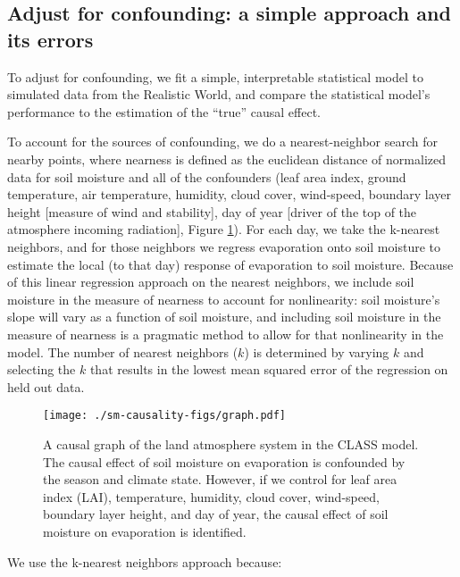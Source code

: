 \subsection{Adjust for confounding: a simple approach and its errors}
\label{sec:attempt-meth-adjust}

To adjust for confounding, we fit a simple, interpretable statistical
model to simulated data from the Realistic World, and compare the
statistical model's performance to the estimation of the ``true''
causal effect.

To account for the sources of confounding, we do a nearest-neighbor
search for nearby points, where nearness is defined as the euclidean
distance of normalized data for soil moisture and all of the
confounders (leaf area index, ground temperature, air temperature,
humidity, cloud cover, wind-speed, boundary layer height [measure of
  wind and stability], day of year [driver of the top of the
  atmosphere incoming radiation], Figure \ref{fig:graph}).  For each
day, we take the k-nearest neighbors, and for those neighbors we
regress evaporation onto soil moisture to estimate the local (to that
day) response of evaporation to soil moisture. Because of this linear
regression approach on the nearest neighbors, we include soil moisture
in the measure of nearness to account for nonlinearity: soil
moisture's slope will vary as a function of soil moisture, and
including soil moisture in the measure of nearness is a pragmatic
method to allow for that nonlinearity in the model. The number of
nearest neighbors ($k$) is determined by varying $k$ and selecting the
$k$ that results in the lowest mean squared error of the regression on
held out data.

\begin{figure}
  \texttt{[image: ./sm-causality-figs/graph.pdf]}
  \caption{A causal graph of the land atmosphere system in the CLASS
    model. The causal effect of soil moisture on evaporation is
    confounded by the season and climate state. However, if we control
    for leaf area index (LAI), temperature, humidity, cloud cover,
    wind-speed, boundary layer height, and day of year, the causal
    effect of soil moisture on evaporation is identified. }
  \label{fig:graph}
\end{figure}

We use the k-nearest neighbors approach because:

